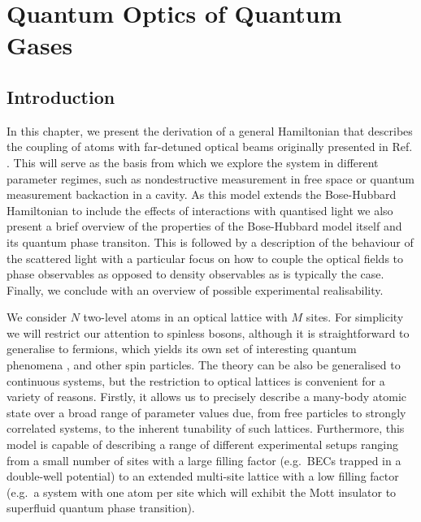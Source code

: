 
\chapter{Quantum Optics of Quantum Gases}  

\ifpdf
    \graphicspath{{Chapter2/Figs/Raster/}{Chapter2/Figs/PDF/}{Chapter2/Figs/}}
\else
    \graphicspath{{Chapter2/Figs/Vector/}{Chapter2/Figs/}}
\fi    

\section{Introduction}

In this chapter, we present the derivation of a general Hamiltonian
that describes the coupling of atoms with far-detuned optical beams
originally presented in Ref. \cite{mekhov2012}. This will serve as the
basis from which we explore the system in different parameter regimes,
such as nondestructive measurement in free space or quantum
measurement backaction in a cavity. As this model extends the
Bose-Hubbard Hamiltonian to include the effects of interactions with
quantised light we also present a brief overview of the properties of
the Bose-Hubbard model itself and its quantum phase transiton. This is
followed by a description of the behaviour of the scattered light with
a particular focus on how to couple the optical fields to phase
observables as opposed to density observables as is typically the
case. Finally, we conclude with an overview of possible experimental
realisability.

We consider $N$ two-level atoms in an optical lattice with $M$
sites. For simplicity we will restrict our attention to spinless
bosons, although it is straightforward to generalise to fermions,
which yields its own set of interesting quantum phenomena
\cite{atoms2015, mazzucchi2016, mazzucchi2016af}, and other spin
particles. The theory can be also be generalised to continuous
systems, but the restriction to optical lattices is convenient for a
variety of reasons. Firstly, it allows us to precisely describe a
many-body atomic state over a broad range of parameter values due,
from free particles to strongly correlated systems, to the inherent
tunability of such lattices. Furthermore, this model is capable of
describing a range of different experimental setups ranging from a
small number of sites with a large filling factor (e.g.~BECs trapped
in a double-well potential) to an extended multi-site lattice with a
low filling factor (e.g.~a system with one atom per site which will
exhibit the Mott insulator to superfluid quantum phase transition).

